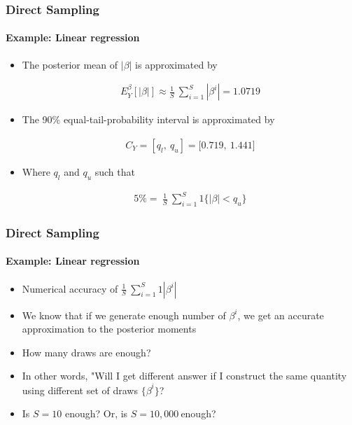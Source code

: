 \documentclass[
  shownotes,
  xcolor={svgnames},
  hyperref={colorlinks,citecolor=DarkBlue,linkcolor=DarkRed,urlcolor=DarkBlue}
  , aspectratio=169]{beamer}
\begin{document}
\begin{frame}[fragile]
\frametitle{Direct Sampling}  
\framesubtitle{Example: Linear regression}

\begin{itemize}
\item The posterior mean of $\left| \beta \right|$ is approximated by

\begin{align}
E_{Y}^{\beta}\left\lbrack \left| \beta \right| \right\rbrack \approx \frac{1}{S}\ \sum_{i = 1}^{S}{\left| \beta^{i} \right| = 1.0719}
\end{align}

\item The 90\% equal-tail-probability interval is approximated by

\begin{align}
C_{Y} = \left\lbrack q_{l},\ q_{u} \right\rbrack = \lbrack 0.719,\ 1.441\rbrack
\end{align}


\item Where $q_{l}$ and $q_{u}$ such that

\begin{align}
5\% = \ \frac{1}{S}\ \sum_{i = 1}^{S}{1\{\left| \beta \right| < q_{u}\}}
\end{align}
\end{itemize}

\end{frame}
\begin{frame}[fragile]
\frametitle{Direct Sampling}
\framesubtitle{Example: Linear regression}

\begin{itemize}
\item Numerical accuracy of $\frac{1}{S}\ \sum_{i = 1}^{S}{1\left| \beta^{i} \right|}$
\medskip
\item We know that if we generate enough number of $\beta^{i}$, we get an accurate approximation to the posterior moments
\medskip
\item How many draws are enough?
\medskip
\item In other words, "Will I get different answer if I construct the same quantity using different set of draws ${\{\beta}^{i}\}$?
\medskip
\item Is $S = 10$ enough? Or, is $S = 10,000\ $enough?
\end{itemize}
\end{frame}
\end{document}
